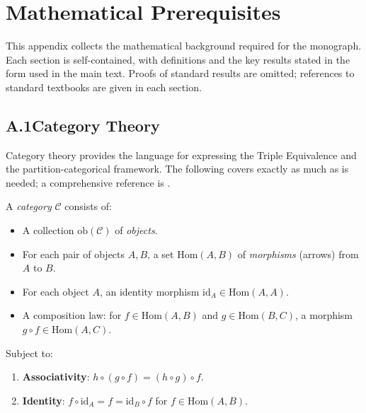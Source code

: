 
\chapter*{Mathematical Prerequisites}
\label{app:math}

This appendix collects the mathematical background required for the monograph.
Each section is self-contained, with definitions and the key results stated
in the form used in the main text. Proofs of standard results are omitted;
references to standard textbooks are given in each section.

\section*{A.1\quad Category Theory}
\label{app:category_theory}

Category theory provides the language for expressing the Triple Equivalence
and the partition-categorical framework. The following covers exactly as much
as is needed; a comprehensive reference is \citet{mac_lane1971categories}.

\begin{definition}[Category]
A \emph{category} $\mathcal{C}$ consists of:
\begin{itemize}
  \item A collection $\mathrm{ob}(\mathcal{C})$ of \emph{objects}.
  \item For each pair of objects $A, B$, a set $\mathrm{Hom}(A, B)$ of
        \emph{morphisms} (arrows) from $A$ to $B$.
  \item For each object $A$, an identity morphism $\mathrm{id}_A \in \mathrm{Hom}(A,A)$.
  \item A composition law: for $f \in \mathrm{Hom}(A,B)$ and $g \in \mathrm{Hom}(B,C)$,
        a morphism $g \circ f \in \mathrm{Hom}(A,C)$.
\end{itemize}
Subject to:
\begin{enumerate}[label=(\roman*)]
  \item \textbf{Associativity}: $h \circ (g \circ f) = (h \circ g) \circ f$.
  \item \textbf{Identity}: $f \circ \mathrm{id}_A = f = \mathrm{id}_B \circ f$
        for $f \in \mathrm{Hom}(A,B)$.
\end{enumerate}
\end{definition}

